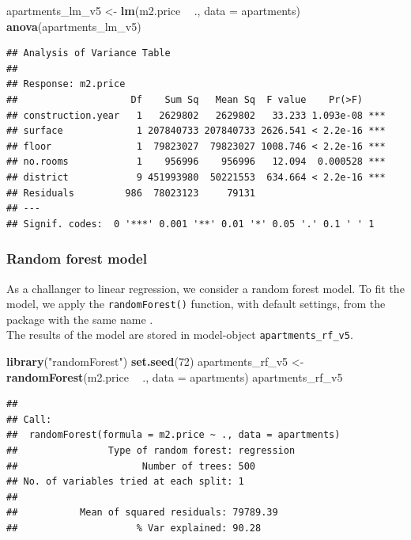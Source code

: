 \documentclass[12pt,]{krantz}
\newenvironment{Shaded}{\begin{snugshade}}{\end{snugshade}}
\newcommand{\DataTypeTok}[1]{\textcolor[rgb]{0.13,0.29,0.53}{#1}}
\newcommand{\DecValTok}[1]{\textcolor[rgb]{0.00,0.00,0.81}{#1}}
\newcommand{\KeywordTok}[1]{\textcolor[rgb]{0.13,0.29,0.53}{\textbf{#1}}}
\newcommand{\NormalTok}[1]{#1}
\newcommand{\OperatorTok}[1]{\textcolor[rgb]{0.81,0.36,0.00}{\textbf{#1}}}
\newcommand{\StringTok}[1]{\textcolor[rgb]{0.31,0.60,0.02}{#1}}
\begin{document}
\begin{Shaded}
\begin{Highlighting}[]
\NormalTok{apartments_lm_v5 <-}\StringTok{ }\KeywordTok{lm}\NormalTok{(m2.price }\OperatorTok{~}\StringTok{ }\NormalTok{., }\DataTypeTok{data =}\NormalTok{ apartments)}
\KeywordTok{anova}\NormalTok{(apartments_lm_v5)}
\end{Highlighting}
\end{Shaded}

\begin{verbatim}
## Analysis of Variance Table
## 
## Response: m2.price
##                    Df    Sum Sq   Mean Sq  F value    Pr(>F)    
## construction.year   1   2629802   2629802   33.233 1.093e-08 ***
## surface             1 207840733 207840733 2626.541 < 2.2e-16 ***
## floor               1  79823027  79823027 1008.746 < 2.2e-16 ***
## no.rooms            1    956996    956996   12.094  0.000528 ***
## district            9 451993980  50221553  634.664 < 2.2e-16 ***
## Residuals         986  78023123     79131                       
## ---
## Signif. codes:  0 '***' 0.001 '**' 0.01 '*' 0.05 '.' 0.1 ' ' 1
\end{verbatim}

\hypertarget{model-Apartments-rf}{%
\subsubsection{Random forest model}\label{model-Apartments-rf}}

As a challanger to linear regression, we consider a random forest model. To fit the model, we apply the \texttt{randomForest()} function, with default settings, from the package with the same name \citep{randomForestRNews}.\\
The results of the model are stored in model-object \texttt{apartments\_rf\_v5}.

\begin{Shaded}
\begin{Highlighting}[]
\KeywordTok{library}\NormalTok{(}\StringTok{"randomForest"}\NormalTok{)}
\KeywordTok{set.seed}\NormalTok{(}\DecValTok{72}\NormalTok{)}
\NormalTok{apartments_rf_v5 <-}\StringTok{ }\KeywordTok{randomForest}\NormalTok{(m2.price }\OperatorTok{~}\StringTok{ }\NormalTok{., }\DataTypeTok{data =}\NormalTok{ apartments)}
\NormalTok{apartments_rf_v5}
\end{Highlighting}
\end{Shaded}

\begin{verbatim}
## 
## Call:
##  randomForest(formula = m2.price ~ ., data = apartments) 
##                Type of random forest: regression
##                      Number of trees: 500
## No. of variables tried at each split: 1
## 
##           Mean of squared residuals: 79789.39
##                     % Var explained: 90.28
\end{verbatim}
\end{document}
